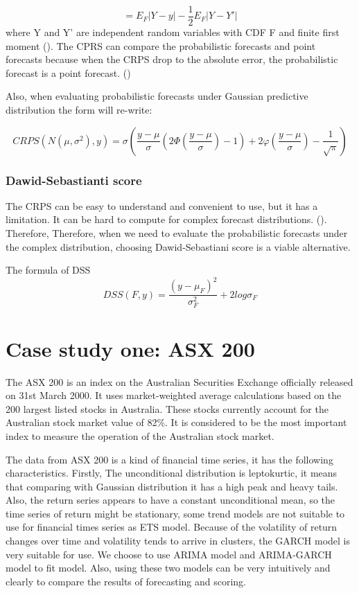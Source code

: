 \documentclass{monashthesis}
\theoremstyle{definition}
\theoremstyle{definition}
\theoremstyle{definition}
\theoremstyle{remark}
\begin{document}
\[
    = E_F|Y-y|-\frac{1}{2}E_F|Y-Y'|
  \] where Y and Y' are independent random variables with CDF F and
finite first moment (\textcite{GR07}). The CPRS can compare the
probabilistic forecasts and point forecasts because when the CRPS drop
to the absolute error, the probabilistic forecast is a point forecast.
(\textcite{GK14})

Also, when evaluating probabilistic forecasts under Gaussian predictive
distribution the form will re-write:

\[
       CRPS(N(\mu,\sigma^2),y)=\sigma\left(\frac{y-\mu}{\sigma}\left(2\Phi\left(\frac{y-\mu}{\sigma}\right)-1\right)+2\varphi\left(\frac{y-\mu}{\sigma}\right)-\frac{1}{\sqrt{\pi}}\right)
  \]

\subsection{Dawid-Sebastianti score}\label{dawid-sebastianti-score}

The CRPS can be easy to understand and convenient to use, but it has a
limitation. It can be hard to compute for complex forecast
distributions. (\textcite{GK14}). Therefore, Therefore, when we need to
evaluate the probabilistic forecasts under the complex distribution,
choosing Dawid-Sebastiani score is a viable alternative.

The formula of DSS \[
     DSS(F,y)=\frac{(y-\mu_F)^2}{\sigma_F^2}+2log\sigma_F
  \]

\chapter{Case study one: ASX 200}\label{case-study-one-asx-200}

The ASX 200 is an index on the Australian Securities Exchange officially
released on 31st March 2000. It uses market-weighted average
calculations based on the 200 largest listed stocks in Australia. These
stocks currently account for the Australian stock market value of 82\%.
It is considered to be the most important index to measure the operation
of the Australian stock market.

The data from ASX 200 is a kind of financial time series, it has the
following characteristics. Firstly, The unconditional distribution is
leptokurtic, it means that comparing with Gaussian distribution it has a
high peak and heavy tails. Also, the return series appears to have a
constant unconditional mean, so the time series of return might be
stationary, some trend models are not suitable to use for financial
times series as ETS model. Because of the volatility of return changes
over time and volatility tends to arrive in clusters, the GARCH model is
very suitable for use. We choose to use ARIMA model and ARIMA-GARCH
model to fit model. Also, using these two models can be very intuitively
and clearly to compare the results of forecasting and scoring.
\end{document}
